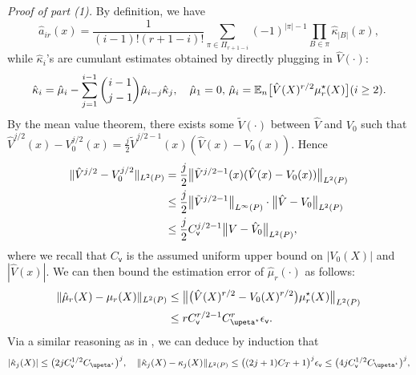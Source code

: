 \documentclass{article}
\def\eps{{\epsilon}}
\newcommand{\E}{\mathbb{E}}
\begin{document}
\textit{Proof of part (1).} By definition, we have
\begin{equation}
    \label{eq:heteroscedastic-hat-a-ik}
    \hat{a}_{ir}(x) = \frac{1}{(i-1)!(r+1-i)!} \sum_{\pi\in\Pi_{r+1-i}} (-1)^{|\pi|-1} \prod_{B\in\pi}\hat{\kappa}_{|B|}(x),
\end{equation}
while $\hat{\kappa}_i$'s are cumulant estimates obtained by directly plugging in $\hat{V}(\cdot)$:
\begin{equation}
    \notag
    \hat{\kappa}_i = \hat{\mu}_i - \sum_{j=1}^{i-1} \binom{i-1}{j-1}\hat{\mu}_{i-j}\hat{\kappa}_j, \quad \hat{\mu}_1=0, \, \hat{\mu}_i= \E_n\big[ \hat{V}(X)^{r/2}\mu_r^{\star}(X) \big] (i\geq 2).
\end{equation}
By the mean value theorem, there exists some $\tilde{V}(\cdot)$ between $\hat{V}$ and $V_0$ such that $\hat{V}^{j/2}(x)-V_0^{j/2}(x) = \frac{j}{2}\tilde{V}^{j/2-1}(x)(\hat{V}(x)-V_0(x))$. Hence
\begin{equation}
    \notag
    \begin{aligned}
        \|\hat{V}^{j/2}-V_0^{j/2}\|_{L^2(P)} &=  \frac{j}{2} \big\|\tilde{V}^{j/2-1}(x)(\hat{V}(x)-V_0(x))\big\|_{L^2(P)}   \\
        &\leq \frac{j}{2} \big\|\tilde{V}^{j/2-1}\big\|_{L^\infty(P)}\cdot \big\|\hat{V}-V_0\big\|_{L^2(P)} \\
        &\leq \frac{j}{2} C_{\mathsf{v}}^{j/2-1} \big\|V-\hat{V}_0\big\|_{L^2(P)},
    \end{aligned}
\end{equation}
where we recall that $C_{\mathsf{v}}$ is the assumed uniform upper bound on $|V_0(X)|$ and $|\hat{V}(x)|$.
We can then bound the estimation error of $\hat{\mu}_r(\cdot)$ as follows:
\begin{equation}
    \notag
    \begin{aligned}
        \|\hat{\mu}_r(X)-\mu_r(X)\|_{L^2(P)} &\leq \big\|\big(\hat{V}(X)^{r/2}-V_0(X)^{r/2}\big)\mu_r^{\star}(X) \big\|_{L^2(P)} \\
        &\leq r C_{\mathsf{v}}^{r/2-1}C_{\upeta^{\star}}^r\eps_{\mathsf{v}}.
    \end{aligned}
\end{equation}
Via a similar reasoning as in , we can deduce by induction that
\begin{equation}
    \notag
    |\hat{\kappa}_j(X)| \leq \big(2jC_{\mathsf{v}}^{1/2}C_{\upeta^{\star}}\big)^j,\quad 
    \|\hat{\kappa}_j(X) - \kappa_j(X)\|_{L^2(P)} \leq \big((2j+1)C_T+1\big)^j\eps_{\mathsf{v}} \leq \big(4jC_{\mathsf{v}}^{1/2}C_{\upeta^{\star}}\big)^j,
\end{equation}
\end{document}
